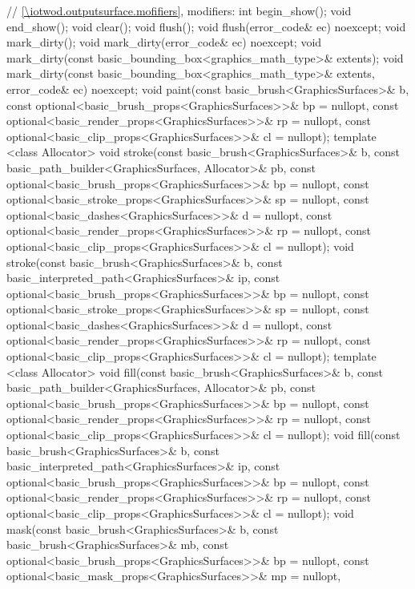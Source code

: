 \begin{codeblock}
{{    // \ref{\iotwod.outputsurface.mofifiers}, modifiers:
    int begin_show();
    void end_show();
    void clear();
    void flush();
    void flush(error_code& ec) noexcept;
    void mark_dirty();
    void mark_dirty(error_code& ec) noexcept;
    void mark_dirty(const basic_bounding_box<graphics_math_type>& extents);
    void mark_dirty(const basic_bounding_box<graphics_math_type>& extents, error_code& ec)
      noexcept;
    void paint(const basic_brush<GraphicsSurfaces>& b,
      const optional<basic_brush_props<GraphicsSurfaces>>& bp = nullopt,
      const optional<basic_render_props<GraphicsSurfaces>>& rp = nullopt,
      const optional<basic_clip_props<GraphicsSurfaces>>& cl = nullopt);
    template <class Allocator>
    void stroke(const basic_brush<GraphicsSurfaces>& b,
      const basic_path_builder<GraphicsSurfaces, Allocator>& pb,
      const optional<basic_brush_props<GraphicsSurfaces>>& bp = nullopt,
      const optional<basic_stroke_props<GraphicsSurfaces>>& sp = nullopt,
      const optional<basic_dashes<GraphicsSurfaces>>& d = nullopt,
      const optional<basic_render_props<GraphicsSurfaces>>& rp = nullopt,
      const optional<basic_clip_props<GraphicsSurfaces>>& cl = nullopt);
    void stroke(const basic_brush<GraphicsSurfaces>& b,
      const basic_interpreted_path<GraphicsSurfaces>& ip,
      const optional<basic_brush_props<GraphicsSurfaces>>& bp = nullopt,
      const optional<basic_stroke_props<GraphicsSurfaces>>& sp = nullopt,
      const optional<basic_dashes<GraphicsSurfaces>>& d = nullopt,
      const optional<basic_render_props<GraphicsSurfaces>>& rp = nullopt,
      const optional<basic_clip_props<GraphicsSurfaces>>& cl = nullopt);
    template <class Allocator>
    void fill(const basic_brush<GraphicsSurfaces>& b,
      const basic_path_builder<GraphicsSurfaces, Allocator>& pb,
      const optional<basic_brush_props<GraphicsSurfaces>>& bp = nullopt,
      const optional<basic_render_props<GraphicsSurfaces>>& rp = nullopt,
      const optional<basic_clip_props<GraphicsSurfaces>>& cl = nullopt);
    void fill(const basic_brush<GraphicsSurfaces>& b,
      const basic_interpreted_path<GraphicsSurfaces>& ip,
      const optional<basic_brush_props<GraphicsSurfaces>>& bp = nullopt,
      const optional<basic_render_props<GraphicsSurfaces>>& rp = nullopt,
      const optional<basic_clip_props<GraphicsSurfaces>>& cl = nullopt);
    void mask(const basic_brush<GraphicsSurfaces>& b,
      const basic_brush<GraphicsSurfaces>& mb,
      const optional<basic_brush_props<GraphicsSurfaces>>& bp = nullopt,
      const optional<basic_mask_props<GraphicsSurfaces>>& mp = nullopt,
}}
\end{codeblock}
